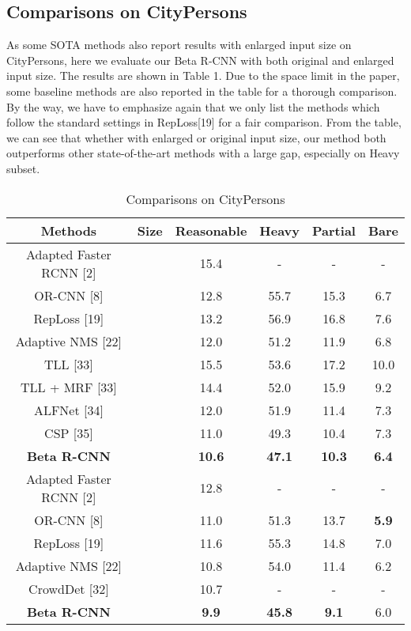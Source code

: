 \documentclass{article}
\begin{document}
\subsection{Comparisons on CityPersons}
As some  SOTA methods also report results with  enlarged input size on CityPersons, here we evaluate our Beta R-CNN with both original and enlarged input size. The results are shown in Table 1. Due to the space limit in the paper, some baseline methods are also reported in the table for a thorough comparison.
By the way, we have to emphasize again that we only list the methods which follow the standard settings in RepLoss[19] for a fair comparison. 
From the table, we can see that whether with  enlarged or original input size, our method both outperforms other state-of-the-art methods with a large gap, especially on Heavy subset.
\begin{table}[htbp]
    \centering
    \caption{Comparisons on CityPersons}
    \begin{tabular}{cccccc}
        \toprule
        Methods & Size &  Reasonable & Heavy & Partial & Bare \\
        \midrule
        Adapted Faster RCNN [2] &  & 15.4 & - & - & - \\
        OR-CNN [8]&  & 12.8 & 55.7 & 15.3 & 6.7 \\
        RepLoss [19]&  & 13.2 & 56.9 & 16.8 & 7.6 \\
        Adaptive NMS [22]&  & 12.0 & 51.2 & 11.9 & 6.8 \\
        TLL [33]&  & 15.5 & 53.6 & 17.2 & 10.0 \\
        TLL + MRF [33]&  & 14.4 & 52.0 & 15.9 & 9.2 \\
        ALFNet [34] &  & 12.0 & 51.9 & 11.4 & 7.3 \\
        CSP [35]&  & 11.0 & 49.3 & 10.4 & 7.3 \\
        \midrule
        
        \textbf{Beta R-CNN} &  &  \textbf{10.6} &  \textbf{47.1} &  \textbf{10.3} &  \textbf{6.4} \\
        \midrule
        \midrule
        Adapted Faster RCNN [2]&  & 12.8 & - & - & - \\
        OR-CNN [8]&  & 11.0 & 51.3 & 13.7 & \textbf{5.9} \\
        RepLoss [19]&  & 11.6 & 55.3 & 14.8 & 7.0 \\
        Adaptive NMS [22]&  & 10.8 & 54.0 & 11.4 & 6.2 \\
        CrowdDet [32]&  & 10.7 & - & - & - \\
        \midrule
        \textbf{Beta R-CNN} &  &  \textbf{9.9} &  \textbf{45.8} &  \textbf{9.1} & 6.0 \\
        \bottomrule
    \end{tabular}
    \label{tab:my_label}
\end{table}
\end{document}

